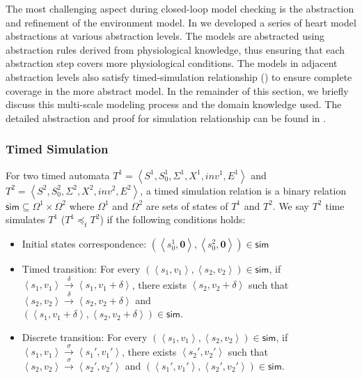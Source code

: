 The most challenging aspect during closed-loop model checking is the abstraction and refinement of the environment model. In \cite{STTT13} we developed a series of heart model abstractions at various abstraction levels. The models are abstracted using abstraction rules derived from physiological knowledge, thus ensuring that each abstraction step covers more physiological conditions. The models in adjacent abstraction levels also satisfy \textsf{timed-simulation} relationship (\cite{simulation}) to ensure complete coverage in the more abstract model. In the remainder of this section, we briefly discuss this multi-scale modeling process and the domain knowledge used. The detailed abstraction and proof for simulation relationship can be found in \cite{STTT13}.


\subsubsection{Timed Simulation}
For two timed automata $T^1=\left\langle S^1,S_0^1,\Sigma^1,X^1,inv^1,E^1\right\rangle$ and $T^2=\left\langle S^2,S_0^2,\Sigma^2,X^2,inv^2,E^2\right\rangle$, a timed simulation relation is a binary relation $\textsf{sim}\subseteq \Omega^1\times \Omega^2$ where $\Omega^1$ and $\Omega^2$ are sets of states of $T^1$ and $T^2$. We say $T^2$ \textsf{time simulates} $T^1$ ($T^1 \preceq_t T^2$) if the following conditions holds:
\begin{itemize}
	\item Initial states correspondence: $(\left\langle s_0^1,\textbf{0}\right\rangle,\left\langle s_0^2,\textbf{0}\right\rangle)\in \textsf{sim}$
	\item Timed transition: For every $(\left\langle s_1,v_1\right\rangle,\left\langle s_2,v_2\right\rangle)\in\textsf{sim}$, if $\left\langle s_1,v_1\right\rangle\xrightarrow{\delta}\left\langle s_1,v_1+\delta\right\rangle$, there exists $\left\langle s_2,v_2+\delta\right\rangle$ such that $\left\langle s_2,v_2\right\rangle\xrightarrow{\delta}\left\langle s_2,v_2+\delta\right\rangle$ and \\$(\left\langle s_1,v_1+\delta\right\rangle,\left\langle s_2,v_2+\delta\right\rangle)\in\textsf{sim}$.
	\item Discrete transition: For every $(\left\langle s_1,v_1\right\rangle,\left\langle s_2,v_2\right\rangle)\in\textsf{sim}$, if $\left\langle s_1,v_1\right\rangle\xrightarrow{\sigma}\left\langle s_1',v_1'\right\rangle$, there exists $\left\langle s_2',v_2'\right\rangle$ such that $\left\langle s_2,v_2\right\rangle\xrightarrow{\sigma}\left\langle s_2',v_2'\right\rangle$ and $(\left\langle s_1',v_1'\right\rangle,\left\langle s_2',v_2'\right\rangle)\in\textsf{sim}$.
\end{itemize}

